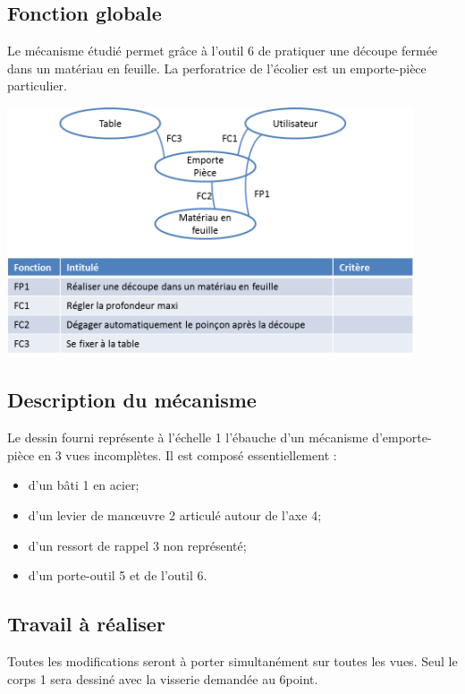 \documentclass[11pt,oneside]{article}
\begin{document}
\subsection*{Fonction globale}
Le mécanisme étudié permet grâce à l’outil 6 de pratiquer une découpe fermée dans un matériau en feuille. La perforatrice de l'écolier est un emporte-pièce particulier.

\begin{center}
\includegraphics[width=12cm]{png/af}
\end{center}

\subsection*{Description du mécanisme}
Le dessin fourni représente à l’échelle 1 l’ébauche d’un mécanisme d’emporte-pièce en 3 vues incomplètes. Il est composé essentiellement :
\begin{itemize}
\item d'un bâti 1 en acier;
\item d'un levier de man\oe{}uvre 2 articulé autour de l’axe 4;
\item d'un ressort de rappel 3 non représenté;
\item d'un porte-outil 5 et de l’outil 6.
\end{itemize}

\subsection*{Travail à réaliser}
Toutes les modifications seront à porter simultanément sur toutes les vues. Seul le corps 1 sera dessiné avec la visserie demandée au 6\ieme point. 
\end{document}
